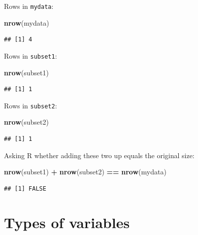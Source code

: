 \documentclass[12pt,]{krantz}
\makeatletter
\newenvironment{Shaded}{\begin{snugshade}}{\end{snugshade}}
\newcommand{\KeywordTok}[1]{\textcolor[rgb]{0.13,0.29,0.53}{\textbf{#1}}}
\newcommand{\NormalTok}[1]{#1}
\newcommand{\OperatorTok}[1]{\textcolor[rgb]{0.81,0.36,0.00}{\textbf{#1}}}
\newcommand{\StringTok}[1]{\textcolor[rgb]{0.31,0.60,0.02}{#1}}
\newenvironment{kframe}{%
\medskip{}
\setlength{\fboxsep}{.8em}
 \def\at@end@of@kframe{}%
 \ifinner\ifhmode%
  \def\at@end@of@kframe{\end{minipage}}%
  \begin{minipage}{\columnwidth}%
 \fi\fi%
 \def\FrameCommand##1{\hskip\@totalleftmargin \hskip-\fboxsep
 \colorbox{shadecolor}{##1}\hskip-\fboxsep
     \hskip-\linewidth \hskip-\@totalleftmargin \hskip\columnwidth}%
 \MakeFramed {\advance\hsize-\width
   \@totalleftmargin\z@ \linewidth\hsize
   \@setminipage}}%
 {\par\unskip\endMakeFramed%
 \at@end@of@kframe}
\renewenvironment{Shaded}{\begin{kframe}}{\end{kframe}}
\theoremstyle{definition}
\theoremstyle{definition}
\theoremstyle{definition}
\theoremstyle{remark}
\makeatother
\begin{document}
Rows in \texttt{mydata}:

\begin{Shaded}
\begin{Highlighting}[]
\KeywordTok{nrow}\NormalTok{(mydata)}
\end{Highlighting}
\end{Shaded}

\begin{verbatim}
## [1] 4
\end{verbatim}

Rows in \texttt{subset1}:

\begin{Shaded}
\begin{Highlighting}[]
\KeywordTok{nrow}\NormalTok{(subset1)}
\end{Highlighting}
\end{Shaded}

\begin{verbatim}
## [1] 1
\end{verbatim}

Rows in \texttt{subset2}:

\begin{Shaded}
\begin{Highlighting}[]
\KeywordTok{nrow}\NormalTok{(subset2)}
\end{Highlighting}
\end{Shaded}

\begin{verbatim}
## [1] 1
\end{verbatim}

Asking R whether adding these two up equals the original size:

\begin{Shaded}
\begin{Highlighting}[]
\KeywordTok{nrow}\NormalTok{(subset1) }\OperatorTok{+}\StringTok{ }\KeywordTok{nrow}\NormalTok{(subset2) }\OperatorTok{==}\StringTok{ }\KeywordTok{nrow}\NormalTok{(mydata)}
\end{Highlighting}
\end{Shaded}

\begin{verbatim}
## [1] FALSE
\end{verbatim}

\hypertarget{types-of-variables}{%
\section{Types of variables}\label{types-of-variables}}
\end{document}
